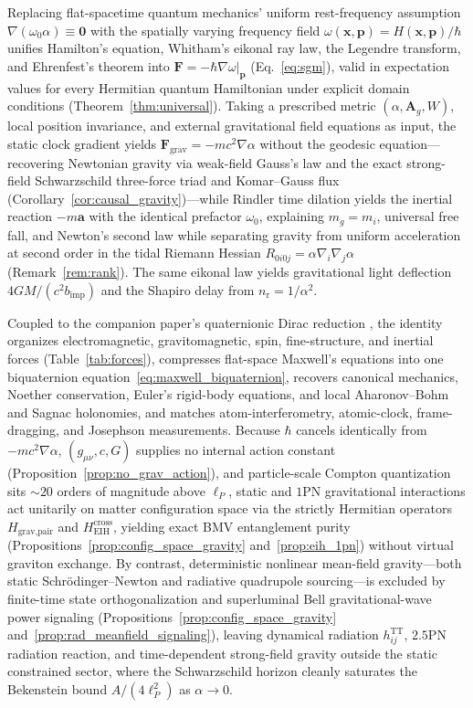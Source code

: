 \documentclass[aps,prd,onecolumn,tightenlines,nofootinbib,notitlepage,10pt,floatfix]{revtex4-2}
\theoremstyle{indentedtheorem}
\begin{document}
Replacing flat-spacetime quantum mechanics' uniform rest-frequency assumption $\nabla(\omega_0\alpha)\equiv\mathbf{0}$ with the spatially varying frequency field $\omega(\mathbf{x},\mathbf{p})=H(\mathbf{x},\mathbf{p})/\hbar$ unifies Hamilton's equation, Whitham's eikonal ray law, the Legendre transform, and Ehrenfest's theorem into $\mathbf{F}=-\hbar\nabla\omega|_{\mathbf{p}}$ (Eq.~\eqref{eq:sgm}), valid in expectation values for every Hermitian quantum Hamiltonian under explicit domain conditions (Theorem~\ref{thm:universal}). Taking a prescribed metric $(\alpha,\mathbf{A}_g,W)$, local position invariance, and external gravitational field equations as input, the static clock gradient yields $\mathbf{F}_\text{grav}=-mc^2\nabla\alpha$ without the geodesic equation---recovering Newtonian gravity via weak-field Gauss's law and the exact strong-field Schwarzschild three-force triad and Komar--Gauss flux (Corollary~\ref{cor:causal_gravity})---while Rindler time dilation yields the inertial reaction $-m\mathbf{a}$ with the identical prefactor $\omega_0$, explaining $m_g=m_i$, universal free fall, and Newton's second law while separating gravity from uniform acceleration at second order in the tidal Riemann Hessian $R_{0i0j}=\alpha\nabla_i\nabla_j\alpha$ (Remark~\ref{rem:rank}). The same eikonal law yields gravitational light deflection $4GM/(c^2 b_\text{imp})$ and the Shapiro delay from $n_\text{r}=1/\alpha^2$.

Coupled to the companion paper's quaternionic Dirac reduction \citep{HutchisonWavefn2026}, the identity organizes electromagnetic, gravitomagnetic, spin, fine-structure, and inertial forces (Table~\ref{tab:forces}), compresses flat-space Maxwell's equations into one biquaternion equation~\eqref{eq:maxwell_biquaternion}, recovers canonical mechanics, Noether conservation, Euler's rigid-body equations, and local Aharonov--Bohm and Sagnac holonomies, and matches atom-interferometry, atomic-clock, frame-dragging, and Josephson measurements. Because $\hbar$ cancels identically from $-mc^2\nabla\alpha$, $(g_{\mu\nu},c,G)$ supplies no internal action constant (Proposition~\ref{prop:no_grav_action}), and particle-scale Compton quantization sits $\sim 20$ orders of magnitude above $\ell_P$, static and $1$PN gravitational interactions act unitarily on matter configuration space via the strictly Hermitian operators $H_\text{grav,pair}$ and $H_\text{EIH}^\text{cross}$, yielding exact BMV entanglement purity (Propositions~\ref{prop:config_space_gravity} and~\ref{prop:eih_1pn}) without virtual graviton exchange. By contrast, deterministic nonlinear mean-field gravity---both static Schr\"odinger--Newton and radiative quadrupole sourcing---is excluded by finite-time state orthogonalization and superluminal Bell gravitational-wave power signaling (Propositions~\ref{prop:config_space_gravity} and~\ref{prop:rad_meanfield_signaling}), leaving dynamical radiation $h_{ij}^\text{TT}$, $2.5$PN radiation reaction, and time-dependent strong-field gravity outside the static constrained sector, where the Schwarzschild horizon cleanly saturates the Bekenstein bound $A/(4\ell_P^2)$ as $\alpha\to 0$.
\end{document}
